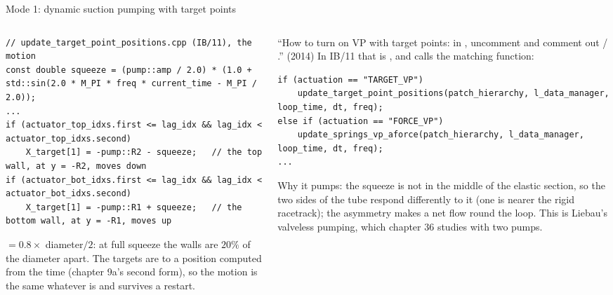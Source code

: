\documentclass[aspectratio=169,11pt]{beamer}
\begin{document}
\begin{frame}[fragile]{Mode 1: dynamic suction pumping with target points}
\label{fr:targetvp}
\begin{columns}[T,onlytextwidth]
\begin{column}{0.52\textwidth}
\begin{lstlisting}[style=cpptiny]
// update_target_point_positions.cpp (IB/11), the motion
const double squeeze = (pump::amp / 2.0) * (1.0 + std::sin(2.0 * M_PI * freq * current_time - M_PI / 2.0));
...
if (actuator_top_idxs.first <= lag_idx && lag_idx < actuator_top_idxs.second)
    X_target[1] = -pump::R2 - squeeze;   // the top wall, at y = -R2, moves down
if (actuator_bot_idxs.first <= lag_idx && lag_idx < actuator_bot_idxs.second)
    X_target[1] = -pump::R1 + squeeze;   // the bottom wall, at y = -R1, moves up
\end{lstlisting}
\footnotesize {} $= 0.8\times$ diameter$/2$: at full squeeze the walls are $20\%$ of the diameter apart. The targets are  to a position computed from the time (chapter 9a's second form), so the motion is the same whatever  is and survives a restart.
\end{column}
\begin{column}{0.46\textwidth}
\footnotesize ``How to turn on VP with target points: in , uncomment  and comment out  / .'' (2014) In IB/11 that is , and  calls the matching function:
\begin{lstlisting}[style=cpptiny]
if (actuation == "TARGET_VP")
    update_target_point_positions(patch_hierarchy, l_data_manager, loop_time, dt, freq);
else if (actuation == "FORCE_VP")
    update_springs_vp_aforce(patch_hierarchy, l_data_manager, loop_time, dt, freq);
...
\end{lstlisting}
\footnotesize Why it pumps: the squeeze is not in the middle of the elastic section, so the two sides of the tube respond differently to it (one is nearer the rigid racetrack); the asymmetry makes a net flow round the loop. This is Liebau's valveless pumping, which chapter 36 studies with two pumps.
\end{column}
\end{columns}
\end{frame}
\end{document}
